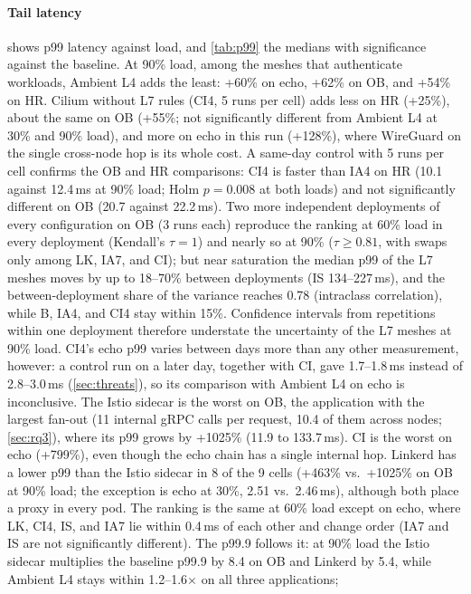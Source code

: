 \paragraph{Tail latency}
 shows p99 latency against load, and \cref{tab:p99} the
medians with significance against the baseline. At 90\% load, among the
meshes that authenticate workloads, Ambient L4 adds the least: +60\% on echo,
+62\% on OB, and +54\% on HR. Cilium without L7 rules (CI4, 5 runs per cell)
adds less on HR (+25\%), about the same on OB (+55\%; not significantly
different from Ambient L4 at 30\% and 90\% load), and more on echo in this
run (+128\%), where WireGuard on the single cross-node hop is its whole cost.
A same-day control with 5 runs per cell confirms the OB and HR comparisons:
CI4 is faster than IA4 on HR (10.1 against 12.4\,ms at 90\% load; Holm
$p=0.008$ at both loads) and not significantly different on OB (20.7 against
22.2\,ms). Two more independent deployments of every configuration on OB
(3 runs each) reproduce the ranking at 60\% load in every deployment
(Kendall's $\tau=1$) and nearly so at 90\% ($\tau\ge 0.81$, with swaps only
among LK, IA7, and CI); but near saturation the median p99 of the L7 meshes
moves by up to 18--70\% between deployments (IS 134--227\,ms), and the
between-deployment share of the variance reaches 0.78 (intraclass
correlation), while B, IA4, and CI4 stay within 15\%. Confidence intervals
from repetitions within one deployment therefore understate the uncertainty
of the L7 meshes at 90\% load.
CI4's echo p99 varies between days more than any other measurement, however:
a control run on a later day, together with CI, gave 1.7--1.8\,ms instead of
2.8--3.0\,ms
(\cref{sec:threats}), so its comparison with Ambient L4 on echo is
inconclusive. The Istio sidecar is
the worst on OB, the application with the largest fan-out (11 internal gRPC calls
per request, 10.4 of them across nodes; \cref{sec:rq3}), where its p99 grows by
+1025\% (11.9 to 133.7\,ms). CI is the worst on echo (+799\%), even though
the echo chain has a single internal hop. Linkerd has a lower p99 than the
Istio sidecar in 8 of the 9 cells (+463\% vs.\ +1025\% on OB at 90\% load;
the exception is echo at 30\%, 2.51 vs.\ 2.46\,ms), although both place a
proxy in every pod. The ranking is the same at 60\% load except on echo, where
LK, CI4, IS, and IA7 lie within 0.4\,ms of each other and change order (IA7
and IS are not significantly different). The p99.9 follows it: at 90\% load the
Istio sidecar multiplies the baseline p99.9 by 8.4 on OB and Linkerd by 5.4,
while Ambient L4 stays within 1.2--1.6$\times$ on all three applications;
